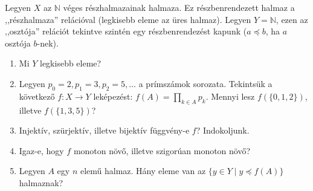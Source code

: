 \documentclass[11pt,a4paper]{article}
\begin{document}
Legyen $X$ az $\mathbb{N}$ véges részhalmazainak halmaza. Ez
részbenrendezett halmaz a ,,részhalmaza'' relációval (legkisebb eleme
az üres halmaz). Legyen $Y=\mathbb{N}$, ezen az ,,osztója'' relációt
tekintve szintén egy részbenrendezést kapunk ($a\preccurlyeq b$, ha $a$
osztója $b$-nek).

\begin{enumerate}

\item Mi $Y$ legkisebb eleme?

\item Legyen $p_0 = 2, p_1 = 3, p_2 = 5, \ldots$ a prímszámok
sorozata. Tekintsük a következő $f \colon X \to Y$ leképezést:
$f(A) = \prod_{k\in A} p_k$. Mennyi lesz $f(\{0, 1, 2\})$, illetve
$f(\{1, 3, 5\})$?

\item Injektív, szürjektív, illetve bijektív függvény-e $f$? Indokoljunk.

\item Igaz-e, hogy $f$ monoton növő, illetve szigorúan monoton növő?

\item Legyen $A$ egy $n$ elemű halmaz. Hány eleme van az $\{y\in Y\mid
y\preccurlyeq f(A)\}$ halmaznak?

\end{enumerate}
\end{document}
